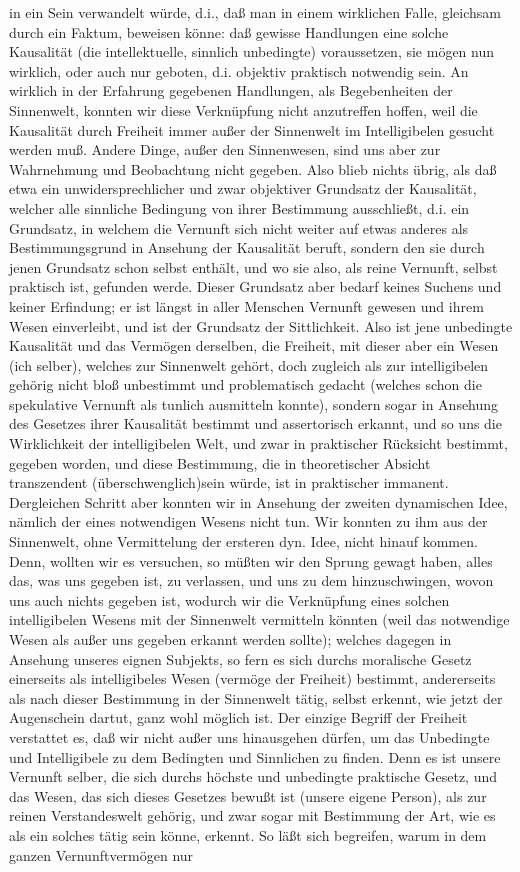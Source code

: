 \documentclass[a4paper,12pt,twoside]{book}
\begin{document}
in ein Sein verwandelt würde, d.i., daß man in einem wirklichen Falle, gleichsam durch ein Faktum, beweisen könne: daß gewisse Handlungen eine solche Kausalität (die intellektuelle, sinnlich unbedingte) voraussetzen, sie mögen nun wirklich, oder auch nur geboten, d.i. objektiv praktisch notwendig sein. An wirklich in der Erfahrung  gegebenen Handlungen, als Begebenheiten der Sinnenwelt, konnten wir diese Verknüpfung nicht anzutreffen hoffen, weil die Kausalität durch Freiheit immer außer der Sinnenwelt im Intelligibelen gesucht werden muß. Andere Dinge, außer den Sinnenwesen, sind uns aber zur Wahrnehmung und Beobachtung nicht gegeben. Also blieb nichts übrig, als daß etwa ein unwidersprechlicher und zwar objektiver Grundsatz der Kausalität, welcher alle sinnliche Bedingung von ihrer Bestimmung ausschließt, d.i. ein Grundsatz, in welchem die Vernunft sich nicht weiter auf etwas anderes als Bestimmungsgrund in Ansehung der Kausalität beruft, sondern den sie durch jenen Grundsatz schon selbst enthält, und wo sie also, als reine Vernunft, selbst praktisch ist, gefunden werde. Dieser Grundsatz aber bedarf keines Suchens und keiner Erfindung; er ist längst in aller Menschen Vernunft gewesen und ihrem Wesen einverleibt, und ist der Grundsatz der Sittlichkeit. Also ist jene unbedingte Kausalität und das Vermögen derselben, die Freiheit, mit dieser aber ein Wesen (ich selber), welches zur Sinnenwelt gehört, doch zugleich als zur intelligibelen gehörig nicht bloß unbestimmt und problematisch gedacht (welches schon die spekulative Vernunft als tunlich ausmitteln konnte), sondern sogar in Ansehung des Gesetzes ihrer Kausalität bestimmt und assertorisch erkannt, und so uns die Wirklichkeit der intelligibelen Welt, und zwar in praktischer Rücksicht bestimmt, gegeben worden, und diese Bestimmung, die in theoretischer Absicht transzendent (überschwenglich)sein würde, ist in praktischer immanent. Dergleichen Schritt aber konnten wir in Ansehung der zweiten dynamischen Idee, nämlich der eines notwendigen Wesens nicht tun. Wir konnten zu ihm aus der Sinnenwelt, ohne Vermittelung der ersteren dyn. Idee, nicht hinauf kommen. Denn, wollten wir es versuchen, so müßten wir den Sprung gewagt haben, alles das, was uns gegeben ist, zu verlassen, und uns zu dem hinzuschwingen, wovon uns auch nichts gegeben ist, wodurch wir die Verknüpfung eines solchen intelligibelen Wesens mit der Sinnenwelt vermitteln könnten (weil das notwendige Wesen als außer uns gegeben  erkannt werden sollte); welches dagegen in Ansehung unseres eignen Subjekts, so fern es sich durchs moralische Gesetz einerseits als intelligibeles Wesen (vermöge der Freiheit) bestimmt, andererseits als nach dieser Bestimmung in der Sinnenwelt tätig, selbst erkennt, wie jetzt der Augenschein dartut, ganz wohl möglich ist. Der einzige Begriff der Freiheit verstattet es, daß wir nicht außer uns hinausgehen dürfen, um das Unbedingte und Intelligibele zu dem Bedingten und Sinnlichen zu finden. Denn es ist unsere Vernunft selber, die sich durchs höchste und unbedingte praktische Gesetz, und das Wesen, das sich dieses Gesetzes bewußt ist (unsere eigene Person), als zur reinen Verstandeswelt gehörig, und zwar sogar mit Bestimmung der Art, wie es als ein solches tätig sein könne, erkennt. So läßt sich begreifen, warum in dem ganzen Vernunftvermögen nur 
\end{document}
